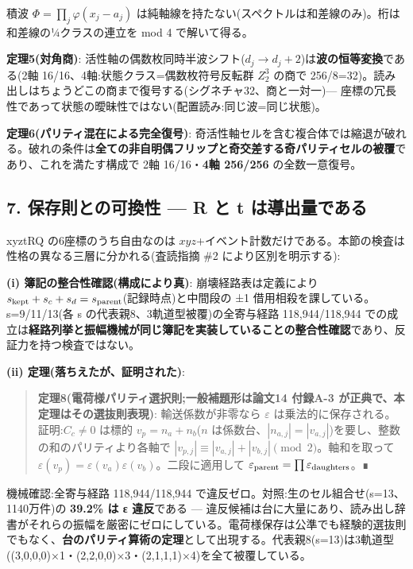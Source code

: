\documentclass[
]{ltjsarticle}
\begin{document}
積波 \(\Phi=\prod_j\varphi(x_j-a_j)\)
は純軸線を持たない(スペクトルは和差線のみ)。桁は和差線の¼クラスの連立を
mod 4 で解いて得る。

\textbf{定理5(対角商)}:
活性軸の偶数枚同時半波シフト(\(d_j\to d_j+2\))は\textbf{波の恒等変換}である(2軸
16/16、4軸:状態クラス=偶数枚符号反転群 \(Z_2^3\) の商で
256/8=32)。読み出しはちょうどこの商まで復号する(シグネチャ32、商と一対一)---
座標の冗長性であって状態の曖昧性ではない(配置読み:同じ波=同じ状態)。

\textbf{定理6(パリティ混在による完全復号)}:
奇活性軸セルを含む複合体では縮退が破れる。破れの条件は\textbf{全ての非自明偶フリップと奇交差する奇パリティセルの被覆}であり、これを満たす構成で
2軸 16/16・\textbf{4軸 256/256} の全数一意復号。

\subsection{7. 保存則との可換性 --- R と t
は導出量である}\label{ux4fddux5b58ux5247ux3068ux306eux53efux63dbux6027-r-ux3068-t-ux306fux5c0eux51faux91cfux3067ux3042ux308b}

xyztRQ の6座標のうち自由なのは
\(xyz\)+イベント計数だけである。本節の検査は性格の異なる三層に分かれる(査読指摘
\#2 により区別を明示する):

\textbf{(i) 簿記の整合性確認(構成により真)}: 崩壊経路表は定義により
\(s_{\rm kept}+s_c+s_d=s_{\rm parent}\)(記録時点)と中間段の ±1
借用相殺を課している。s=9/11/13(各 s の代表親8、3軌道型被覆)の全寄与経路
118,944/118,944
での成立は\textbf{経路列挙と振幅機械が同じ簿記を実装していることの整合性確認}であり、反証力を持つ検査ではない。

\textbf{(ii) 定理(落ちえたが、証明された)}:

\begin{quote}
\textbf{定理8(電荷様パリティ選択則;一般補題形は論文14 付録A-3
が正典で、本定理はその選抜則表現)}: 輸送係数が非零なら \(\varepsilon\)
は乗法的に保存される。証明:\(C_c\neq0\) は標的 \(v_p=n_a+n_b\)(\(n\)
は係数台、\(|n_{a,j}|=|v_{a,j}|\))を要し、整数の和のパリティより各軸で
\(|v_{p,j}|\equiv|v_{a,j}|+|v_{b,j}|\pmod 2\)。軸和を取って
\(\varepsilon(v_p)=\varepsilon(v_a)\varepsilon(v_b)\)。二段に適用して
\(\varepsilon_{\rm parent}=\prod\varepsilon_{\rm daughters}\)。∎
\end{quote}

機械確認:全寄与経路 118,944/118,944
で違反ゼロ。対照:生のセル組合せ(s=13、1140万件)の \textbf{39.2\% は ε
違反}である ---
違反候補は台に大量にあり、読み出し辞書がそれらの振幅を厳密にゼロにしている。電荷様保存は公準でも経験的選抜則でもなく、\textbf{台のパリティ算術の定理}として出現する。代表親8(s=13)は3軌道型((3,0,0,0)×1・(2,2,0,0)×3・(2,1,1,1)×4)を全て被覆している。
\end{document}

